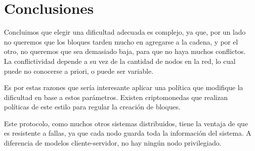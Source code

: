\section{Conclusiones}





% 

Concluimos que elegir una dificultad
adecuada es complejo, ya que, por un lado 
no queremos que los bloques tarden mucho en agregarse 
a la cadena, y por el otro, no queremos que sea demasiado baja, para que
no haya muchos conflictos. La conflictividad depende a su 
vez de la cantidad de nodos en la red, lo cual puede no 
conocerse a priori, o puede ser variable.

Es por estas razones que sería interesante aplicar
una política que modifique la dificultad en base a
estos parámetros. Existen criptomonedas que realizan
políticas de este estilo para regular la creación de bloques.


Este protocolo, como muchos otros sistemas distribuidos, 
tiene la ventaja de que es
resistente a fallas, ya que cada nodo guarda toda 
la información del sistema. A diferencia de modelos
cliente-servidor, no hay ningún nodo privilegiado.

